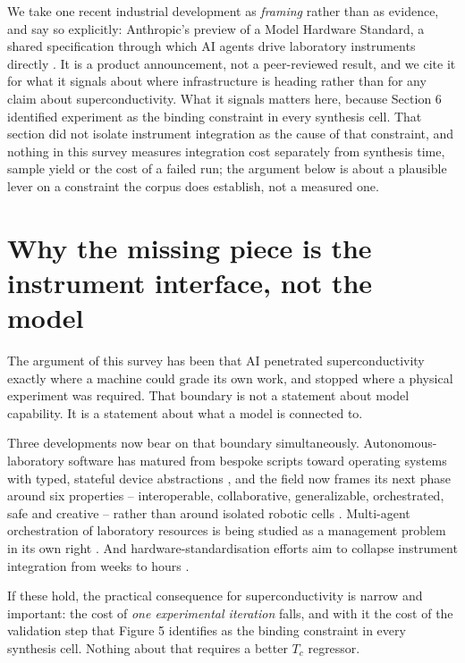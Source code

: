 \documentclass[
  11pt,
]{article}
\begin{document}
We take one recent industrial development as \emph{framing} rather than
as evidence, and say so explicitly: Anthropic's preview of a Model
Hardware Standard, a shared specification through which AI agents drive
laboratory instruments directly \citep{anthropic2026mhs}. It is a
product announcement, not a peer-reviewed result, and we cite it for
what it signals about where infrastructure is heading rather than for
any claim about superconductivity. What it signals matters here, because
Section 6 identified experiment as the binding constraint in every
synthesis cell. That section did not isolate instrument integration as
the cause of that constraint, and nothing in this survey measures
integration cost separately from synthesis time, sample yield or the
cost of a failed run; the argument below is about a plausible lever on a
constraint the corpus does establish, not a measured one.

\section{Why the missing piece is the instrument interface, not the
model}\label{why-the-missing-piece-is-the-instrument-interface-not-the-model}

The argument of this survey has been that AI penetrated
superconductivity exactly where a machine could grade its own work, and
stopped where a physical experiment was required. That boundary is not a
statement about model capability. It is a statement about what a model
is connected to.

Three developments now bear on that boundary simultaneously.
Autonomous-laboratory software has matured from bespoke scripts toward
operating systems with typed, stateful device abstractions
\citep{gao2025unilabos}, and the field now frames its next phase around
six properties -- interoperable, collaborative, generalizable,
orchestrated, safe and creative -- rather than around isolated robotic
cells \citep{lee2026toward}. Multi-agent orchestration of laboratory
resources is being studied as a management problem in its own right
\citep{kusne2026managing}. And hardware-standardisation efforts aim to
collapse instrument integration from weeks to hours
\citep{anthropic2026mhs}.

If these hold, the practical consequence for superconductivity is narrow
and important: the cost of \emph{one experimental iteration} falls, and
with it the cost of the validation step that Figure 5 identifies as the
binding constraint in every synthesis cell. Nothing about that requires
a better \(T_c\) regressor.
\end{document}
